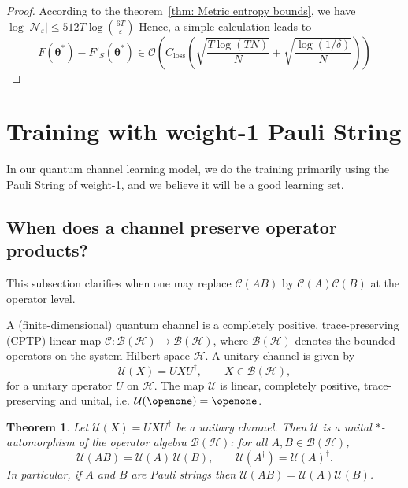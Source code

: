 \documentclass[%
 reprint,
 amsmath,amssymb,
 aps,
]{revtex4-2}
\newtheorem{theorem}{Theorem}[section]
\begin{document}
\begin{proof}
    According to the theorem~\ref{thm: Metric entropy bounds}, we have $\log{|\mathcal{N}_\varepsilon|}\le 512 T\log{\left(
    \frac{6T}{\varepsilon}\right)
    }$
    Hence, a simple calculation leads to
\begin{equation}
        F\left(\boldsymbol{\theta}^*\right)-F'_S\left(\boldsymbol{\theta}^*\right) \in \mathcal{O}\left(C_{\operatorname{loss}}\left(\sqrt{\frac{T \log (T N)}{N}}+\sqrt{\frac{\log (1 / \delta)}{N}}\right)\right)
    \end{equation}
\end{proof}

\section{Training with weight-1 Pauli String}

In our quantum channel learning model, we do the training primarily using the Pauli String of weight-1, and we believe it will be a good learning set.

\subsection{When does a channel preserve operator products?}

This subsection clarifies when one may replace $\mathcal{C}(AB)$ by $\mathcal{C}(A)\mathcal{C}(B)$ at the
operator level.

A (finite-dimensional) quantum channel is a completely positive,
trace-preserving (CPTP) linear map
\(\mathcal{C}:\mathcal{B}(\mathcal{H})\to\mathcal{B}(\mathcal{H})\),
where $\mathcal{B}(\mathcal{H})$ denotes the bounded operators on the system Hilbert space $\mathcal{H}$. A unitary channel is given by
\begin{equation}
  \mathcal{U}(X) = U X U^{\dagger},
  \qquad X\in\mathcal{B}(\mathcal{H}),
\end{equation}
for a unitary operator $U$ on $\mathcal{H}$. The map $\mathcal{U}$ is linear, completely positive, trace-preserving
and unital, i.e. $\mathcal{U}(\openone)=\openone$.

\begin{theorem}
Let $\mathcal{U}(X)=UXU^{\dagger}$ be a unitary channel. Then
$\mathcal{U}$ is a unital $*$-automorphism of the operator algebra
$\mathcal{B}(\mathcal{H})$: for all $A,B\in\mathcal{B}(\mathcal{H})$,
\begin{equation}
  \mathcal{U}(AB)=\mathcal{U}(A)\,\mathcal{U}(B),
  \qquad
  \mathcal{U}(A^{\dagger})=\mathcal{U}(A)^{\dagger}.
\end{equation}
In particular, if $A$ and $B$ are Pauli strings then
$\mathcal{U}(AB)=\mathcal{U}(A)\mathcal{U}(B)$.
\end{theorem}
\end{document}
